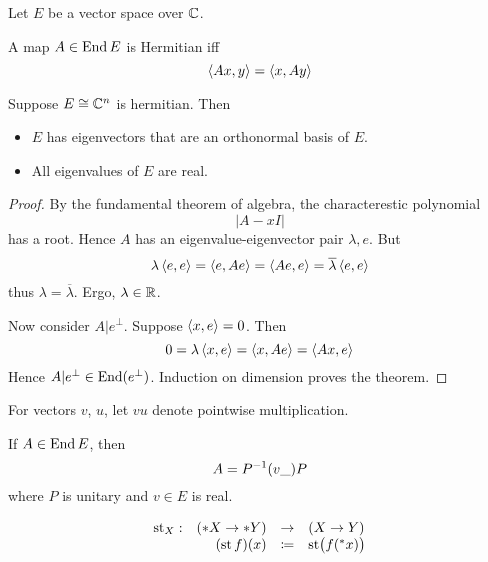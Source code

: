 \documentclass{scrartcl}
\newcommand{\conj}[1]{\overline{#1}}
\newcommand{\hyper}[1]{\prescript{*}{}{#1}}
\renewcommand{\define}{\coloneqq}
\DeclareMathOperator{\st}{st}
\begin{document}
  Let $E$ be a vector space over $\mathbb{C}$. 
\begin{defn}[Hermitian]
  A map $A\in \operatorname{End}{E}$ is Hermitian iff
  \[
    \left\langle Ax, y \right\rangle=\left\langle x, Ay \right\rangle
  \]
\end{defn}
\begin{theorem}
  \label{finite-spectral-theorem}
  Suppose $E\cong \mathbb{C}^n$ is hermitian. Then
  \begin{itemize}
  \item $E$ has eigenvectors that are an orthonormal basis of $E$.
  \item All eigenvalues of $E$ are real. 
  \end{itemize}

\end{theorem}
\begin{proof}
  \renewcommand{\vec}{}
  By the fundamental theorem of algebra, the characterestic polynomial
  \[
    |A-xI|
  \]
  has a root. Hence $A$ has an eigenvalue-eigenvector pair $\lambda, \vec e$. But
  \[
    \lambda \inner{\vec e}{\vec e}=\inner{\vec e}{A \vec e}=\inner{A\vec e}{\vec e}=\conj\lambda \inner{\vec e}{\vec e}
  \]
  thus $\lambda = \conj\lambda$. Ergo, $\lambda\in \mathbb{R}$. 

  Now consider $A|e^\perp$. Suppose $\left\langle x, e \right\rangle=0$. Then 
  \[
    0=\lambda\left\langle x, e \right\rangle=\left\langle x, Ae \right\rangle=\left\langle Ax, e \right\rangle
  \]
  Hence $A|e^\perp\in\operatorname{End}(e^\perp)$. Induction on dimension proves the theorem. 
\end{proof}

For vectors $v$, $u$, let $vu$ denote pointwise multiplication. 
\begin{cor}[diagonalization]
  \label{thm:diag}
  If $A\in\operatorname{End} E$, then 
  \[
    A=P^{-1}(v\_)P\\
  \]
  where $P$ is unitary and $v\in E$ is real.
\end{cor}

\begin{defn}
  \[
  \begin{array}{lrll}
   \st_X: &(*X \to *Y) &\to& (X \to Y) \\
    &(\st f)(x) &\define& \st\bigl( f(\hyper x)\bigr)
  \end{array}
  \]
\end{defn}
\end{document}
